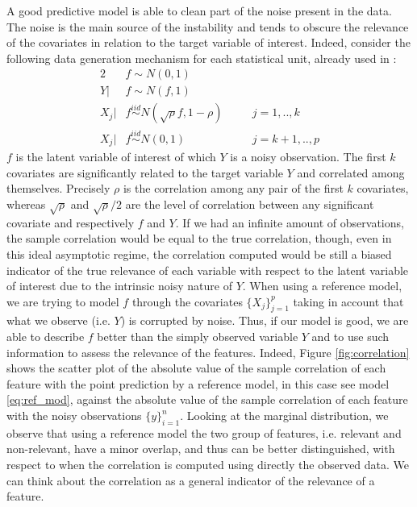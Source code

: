 \documentclass[american,]{article}
\theoremstyle{definition}
\begin{document}
A good predictive model is able to clean part of the noise present in the data. The noise is the main source of the instability and tends to obscure the relevance of the covariates in relation to the target variable of interest. Indeed, consider the following data generation mechanism for each statistical unit, already used in \cite{paper:projpred}:
\
\begin{alignat}{2} \label{eq:simulated_data}
     &f\sim N(0,1) && \nonumber \\ 
     Y|&f\sim N(f,1) && \\
     X_{j}|&f \overset{iid}{\sim} N(\sqrt{\rho}f,1-\rho) \quad &&j=1,..,k \nonumber \\
     X_{j}|&f \overset{iid}{\sim} N(0,1) &&j=k+1,..,p \nonumber
\end{alignat}
$f$ is the latent variable of interest of which $Y$ is a noisy observation. The first $k$ covariates are significantly related to the target variable $Y$ and correlated among themselves. Precisely $\rho$ is the correlation among any pair of the first $k$ covariates, whereas $\sqrt{\rho}$ and $\sqrt{\rho}/2$ are the level of correlation between any significant covariate and respectively $f$ and $Y$. If we had an infinite amount of observations, the sample correlation would be equal to the true correlation, though, even in this ideal asymptotic regime, the correlation computed would be still a biased indicator of the true relevance of each variable with respect to the latent variable of interest due to the intrinsic noisy nature of $Y$. When using a reference model, we are trying to model $f$ through the covariates $\{X_{j}\}_{j=1}^{p}$ taking in account that what we observe (i.e. $Y$) is corrupted by noise. Thus, if our model is good, we are able to describe $f$ better than the simply observed variable $Y$ and to use such information to assess the relevance of the features. Indeed, Figure \ref{fig:correlation} shows the scatter plot of the absolute value of the sample correlation of each feature with the point prediction by a reference model, in this case see model \eqref{eq:ref_mod}, against the absolute value of the sample correlation of each feature with the noisy observations $\{y\}_{i=1}^{n}$. Looking at the marginal distribution, we observe that using a reference model the two group of features, i.e. relevant and non-relevant, have a minor overlap, and thus can be better distinguished, with respect to when the correlation is computed using directly the observed data. We can think about the correlation as a general indicator of the relevance of a feature.  
\end{document}
